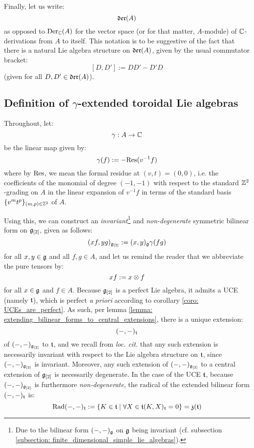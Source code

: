         Finally, let us write:
            $$\mathfrak{der}(A)$$
        as opposed to $\mathrm{Der}_{\mathbb{C}}(A)$ for the vector space (or for that matter, $A$-module) of $\mathbb{C}$-derivations from $A$ to itself. This notation is to be suggestive of the fact that there is a natural Lie algebra structure on $\mathfrak{der}(A)$, given by the usual commutator bracket:
            $$[D, D'] := DD' - D'D$$
        (given for all $D, D' \in \mathfrak{der}(A)$).
    
    \subsection{Definition of \texorpdfstring{$\gamma$}{}-extended toroidal Lie algebras} \label{subsection: definition_of_yangian_extended_toroidal_lie_algebras}
        \begin{convention}
            Throughout, let:
                $$\gamma: A \to \mathbb{C}$$
            be the linear map given by:
                $$\gamma(f) := -\mathrm{Res}(v^{-1} f)$$
            where by $\mathrm{Res}$, we mean the formal residue at $(v, t) = (0, 0)$, i.e. the coefficients of the monomial of degree $(-1, -1)$ with respect to the standard $\mathbb{Z}^2$-grading on $A$ in the linear expansion of $v^{-1} f$ in terms of the standard basis $\{v^m t^p\}_{(m, p) \in \mathbb{Z}^2}$ of $A$. 
        \end{convention}
        
        Using this, we can construct an \textit{invariant}\footnote{Due to the bilinear form $(-, -)_{\mathfrak{g}}$ on $\mathfrak{g}$ being invariant (cf. subsection \ref{subsection: finite_dimensional_simple_lie_algebras}).} and \textit{non-degenerate} symmetric bilinear form on $\mathfrak{g}_{[2]}$, given as follows:
            $$(xf, yg)_{\mathfrak{g}_{[2]}} := (x, y)_{\mathfrak{g}} \gamma(fg)$$
        for all $x, y \in \mathfrak{g}$ and all $f, g \in A$, and let us remind the reader that we abbreviate the pure tensors by:
            $$xf := x \tensor f$$
        for all $x \in \mathfrak{g}$ and $f \in A$. Because $\mathfrak{g}_{[2]}$ is a perfect Lie algebra, it admits a UCE (namely $\mathfrak{t}$), which is perfect \textit{a priori} according to corollary \ref{coro: UCEs_are_perfect}. As such, per lemma \ref{lemma: extending_bilinear_forms_to_central_extensions}, there is a unique extension:
            $$(-, -)_{\mathfrak{t}}$$
        of $(-, -)_{\mathfrak{g}_{[2]}}$ to $\mathfrak{t}$, and we recall from \textit{loc. cit.} that any such extension is necessarily invariant with respect to the Lie algebra structure on $\mathfrak{t}$, since $(-, -)_{\mathfrak{g}_{[2]}}$ is invariant. Moreover, any such extension of $(-, -)_{\mathfrak{g}_{[2]}}$ to a central extension of $\mathfrak{g}_{[2]}$ is necessarily degenerate. In the case of the UCE $\mathfrak{t}$, because $(-, -)_{\mathfrak{g}_{[2]}}$ is furthermore \textit{non-degenerate}, the radical of the extended bilinear form $(-, -)_{\mathfrak{t}}$ is:
            $$\operatorname{Rad}(-, -)_{\mathfrak{t}} := \{ K \in \mathfrak{t} \mid \forall X \in \mathfrak{t} (K, X)_{\mathfrak{t}} = 0 \} = \mathfrak{z}(\mathfrak{t})$$
            
